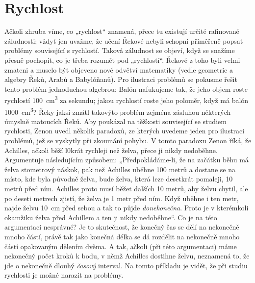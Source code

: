   \section{Rychlost}
    Ačkoli zhruba víme, co „rychlost“ znamená, přece tu existují určité rafinované záludnosti; 
    vždyť jen uvažme, že učení Řekové nebyli schopni přiměřeně popsat problémy související s 
    rychlostí. Taková záludnost se objeví, když se snažíme přesně pochopit, co je třeba rozumět pod 
    „rychlostí“. Řekové z toho byli velmi zmateni a muselo být objeveno nové odvětví matematiky 
    (vedle geometrie a algebry Řeků, Arabů a Babylóňanů). Pro ilustraci problémů se pokusme řešit 
    tento problém jednoduchou algebrou: Balón nafukujeme tak, že jeho objem roste rychlostí 
    \qty{100}{\cubic\cm} za sekundu; jakou rychlostí roste jeho poloměr, když má balón 
    \qty{1000}{\cubic\cm}? Řeky jaksi zmátl takovýto problém zejména zásluhou některých úmyslně 
    matoucích Řeků. Aby poukázal na těžkosti související se studiem rychlosti, Zenon uvedl několik 
    paradoxů, ze kterých uvedeme jeden pro ilustraci problémů, jež se vyskytly při zkoumání pohybu. 
    V tomto paradoxu Zenon říká, že Achilles, ačkoli běží l0krát rychleji než želva, přece ji nikdy 
    nedoběhne. Argumentuje následujícím způsobem: „Předpokládáme-li, že na začátku běhu má želva 
    stometrový náskok, pak než Achilles uběhne \num{100} metrů a dostane se na místo, kde byla 
    původně želva, bude želva, která leze desetkrát pomaleji, \num{10} metrů před ním. Achilles 
    proto musí běžet dalších \num{10} metrů, aby želvu chytil, ale po deseti metrech zjistí, že 
    želva je \num{1} metr před ním. Když uběhne i ten metr, najde želvu \qty{10}{\cm} před sebou a 
    tak to půjde \emph{donekonečna}. Proto je v kterémkoli okamžiku želva před Achillem a ten ji 
    nikdy nedoběhne“. Co je na této argumentaci nesprávné? Je to skutečnost, že konečný čas se dělí 
    na nekonečně mnoho částí, právě tak jako konečná délka se dá rozdělit na nekonečně mnoho částí 
    opakovaným dělením dvěma. A tak, ačkoli (při této argumentaci) máme nekonečný počet kroků k 
    bodu, v němž Achilles dostihne želvu, neznamená to, že jde o nekonečně dlouhý \emph{časový} 
    interval. Na tomto příkladu je vidět, že při studiu rychlosti je možné narazit na problémy.
    

